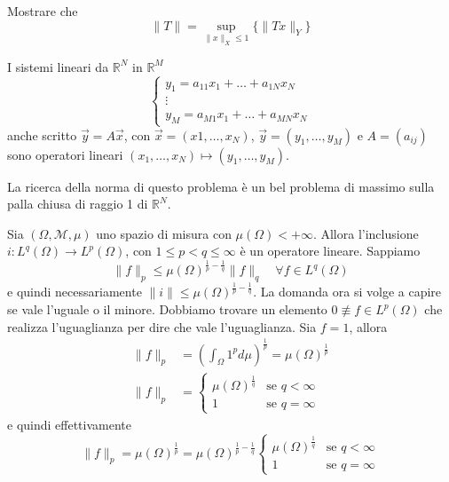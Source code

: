 \begin{eser}
    Mostrare che
    \[
        \|T\| = \sup_{\|x\|_X \le 1}  \{\|Tx\|_Y \} 
    \]
\end{eser}
\begin{example}
    I sistemi lineari da \(\mathbb{R}^{N}\) in \(\mathbb{R}^{M}\)
    \[
        \begin{cases}
            y_1 = a_{11}x_1 + \ldots + a_{1N}x_N \\
            \vdots \\
            y_M = a_{M1}x_1 + \ldots + a_{MN}x_N
        \end{cases}
    \]
    anche scritto \(\vec{y} = A \vec{x}\), con \(\vec{x} = {(x1, \dots, x_N)}\),
    \(\vec{y} = {(y_{1}, \dots, y_M)}\) e \(A = {(a_{ij})}\) 
    sono operatori lineari \({(x_{1}, \dots, x_N) \mapsto {(y_{1}, \dots,
    y_M)}}\).

    La ricerca della norma di questo problema è un bel problema di massimo sulla
    palla chiusa di raggio 1 di \(\mathbb{R}^{N}\).
\end{example}
\begin{example}
    Sia \({(\Omega, \mathcal{M}, \mu)}\) uno spazio di misura con
    \(\mu{(\Omega)} < +\infty\). Allora l'inclusione \(i : L^{q}{(\Omega)} \to
    L^{p}{(\Omega)}\), con \(1 \le p < q \le \infty\) è un operatore lineare.
    Sappiamo
    \[
        \|f\|_p \le {\mu{(\Omega)}}^{\frac{1}{p} - \frac{1}{q}}\|f\|_q \quad \forall
        f \in L^{q}{(\Omega)}
    \]
    e quindi necessariamente \(\|i\| \le \mu{(\Omega)}^{\frac{1}{p} -
    \frac{1}{q}}\). La domanda ora si volge a capire se vale l'uguale o il
    minore. Dobbiamo trovare un elemento \(0 \not\equiv f \in L^{p}{(\Omega)}\)
    che realizza l'uguaglianza per dire che vale l'uguaglianza.
    Sia \(f = 1\), allora
    \begin{align*}
        \|f\|_p &= {\left( \int_\Omega 1^{p}d\mu \right)} ^{\frac{1}{p}} =
        \mu{(\Omega)}^{\frac{1}{p}} \\
        \|f\|_p &= \begin{cases}
            \mu{(\Omega)}^{\frac{1}{q}} & \text{se } q <
            \infty \\
            1 & \text{se } q = \infty
        \end{cases}
    \end{align*}
    e quindi effettivamente
    \[
        \|f\|_p = \mu{(\Omega)}^{\frac{1}{p}} = \mu{(\Omega)}^{\frac{1}{p} -
        \frac{1}{q}}\begin{cases}
                \mu{(\Omega)}^{\frac{1}{q}} & \text{se } q < \infty \\
                1 & \text{se } q = \infty
            \end{cases}
    \]
\end{example}
